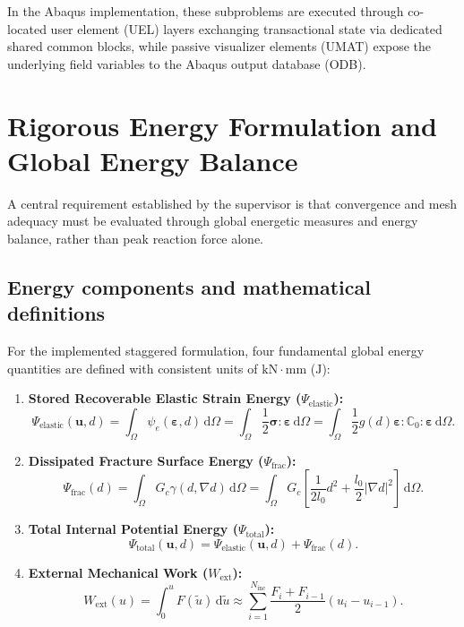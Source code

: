 In the Abaqus implementation, these subproblems are executed through co-located user element (UEL) layers exchanging transactional state via dedicated shared common blocks, while passive visualizer elements (UMAT) expose the underlying field variables to the Abaqus output database (ODB).

\section{Rigorous Energy Formulation and Global Energy Balance}
\label{sec:energy_formulation}

A central requirement established by the supervisor is that convergence and mesh adequacy must be evaluated through global energetic measures and energy balance, rather than peak reaction force alone.

\subsection{Energy components and mathematical definitions}
For the implemented staggered formulation, four fundamental global energy quantities are defined with consistent units of $\mathrm{kN\cdot mm}$ ($\mathrm{J}$):
\begin{enumerate}
  \item \textbf{Stored Recoverable Elastic Strain Energy ($\Psi_{\mathrm{elastic}}$):}
  \begin{equation}
  \Psi_{\mathrm{elastic}}(\mathbf{u},d) = \int_{\Omega} \psi_e(\boldsymbol{\varepsilon},d)\,\mathrm{d}\Omega = \int_{\Omega} \frac{1}{2}\boldsymbol{\sigma}:\boldsymbol{\varepsilon}\,\mathrm{d}\Omega = \int_{\Omega} \frac{1}{2} g(d) \boldsymbol{\varepsilon} : \mathbb{C}_0 : \boldsymbol{\varepsilon}\,\mathrm{d}\Omega.
  \label{eq:psi_elastic}
  \end{equation}
  \item \textbf{Dissipated Fracture Surface Energy ($\Psi_{\mathrm{frac}}$):}
  \begin{equation}
  \Psi_{\mathrm{frac}}(d) = \int_{\Omega} G_c \gamma(d,\nabla d)\,\mathrm{d}\Omega = \int_{\Omega} G_c \left[ \frac{1}{2l_0}d^2 + \frac{l_0}{2}\lvert\nabla d\rvert^2 \right]\,\mathrm{d}\Omega.
  \label{eq:psi_frac}
  \end{equation}
  \item \textbf{Total Internal Potential Energy ($\Psi_{\mathrm{total}}$):}
  \begin{equation}
  \Psi_{\mathrm{total}}(\mathbf{u},d) = \Psi_{\mathrm{elastic}}(\mathbf{u},d) + \Psi_{\mathrm{frac}}(d).
  \label{eq:psi_total}
  \end{equation}
  \item \textbf{External Mechanical Work ($W_{\mathrm{ext}}$):}
  \begin{equation}
  W_{\mathrm{ext}}(u) = \int_0^u F(\tilde{u})\,\mathrm{d}\tilde{u} \approx \sum_{i=1}^{N_{\mathrm{inc}}} \frac{F_i + F_{i-1}}{2} (u_i - u_{i-1}).
  \label{eq:w_ext}
  \end{equation}
\end{enumerate}

